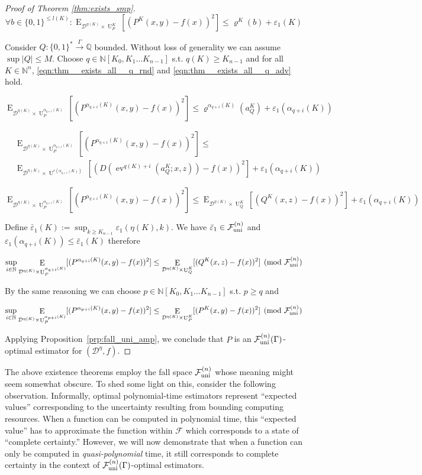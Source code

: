 \documentclass[11pt]{article}
\numberwithin{equation}{section}
\theoremstyle{definition}
\theoremstyle{plain}
\newcommand{\Bool}{\{0,1\}}
\newcommand{\Words}{{\Bool^*}}
\DeclareMathOperator{\E}{E}
\DeclareMathOperator{\Ev}{ev}
\DeclareMathOperator{\Un}{U}
\newcommand{\Nats}{\mathbb{N}}
\newcommand{\Rats}{\mathbb{Q}}
\newcommand{\NatPoly}{\Nats[K_0, K_1 \ldots K_{n-1}]}
\newcommand{\Abs}[1]{\lvert #1 \rvert}
\newcommand{\Dist}{\mathcal{D}}
\newcommand{\Fall}{\mathcal{F}}
\newcommand{\FallU}{{\Fall_{\textnormal{uni}}^{(n)}}}
\newcommand{\Scheme}{\xrightarrow{\Gamma}}
\begin{document}
\begin{proof}[Proof of Theorem \ref{thm:exists_smp}]
\[\forall b \in \Bool^{\leq l(K)}: \E_{\Dist^{\eta(K)} \times \Un_P^K}[(P^K(x,y)-f(x))^2] \leq \varrho^K(b) + \varepsilon_1(K)\]

Consider ${Q: \Words \Scheme \Rats}$ bounded. Without loss of generality we can assume ${\sup \Abs{Q} \leq M}$. Choose ${q \in \NatPoly}$ s.t. ${q(K) \geq K_{n-1}}$ and for all ${K \in \Nats^n}$, \ref{eqn:thm__exists_all__q_rnd} and \ref{eqn:thm__exists_all__q_adv} hold.

\[\E_{\Dist^{\eta(K)} \times \Un_P^{\alpha_{q+i}(K)}}[(P^{\alpha_{q+i}(K)}(x,y)-f(x))^2] \leq \varrho^{\alpha_{q+i}(K)}(a_Q^K) + \varepsilon_1(\alpha_{q+i}(K))\]

\begin{align*}
&\E_{\Dist^{\eta(K)} \times \Un_P^{\alpha_{q+i}(K)}}[(P^{\alpha_{q+i}(K)}(x,y)-f(x))^2] \leq\\ 
&\E_{\Dist^{\eta(K)} \times \Un^{r(\alpha_{q+i}(K))}}[(D(\Ev^{q(K)+i}(a_Q^K;x,z))-f(x))^2] + \varepsilon_1(\alpha_{q+i}(K))
\end{align*}

\[\E_{\Dist^{\eta(K)} \times \Un_P^{\alpha_{q+i}(K)}}[(P^{\alpha_{q+i}(K)}(x,y)-f(x))^2] \leq \E_{\Dist^{\eta(K)} \times \Un_Q^K}[(Q^K(x,z)-f(x))^2] + \varepsilon_1(\alpha_{q+i}(K))\]

Define ${\bar{\varepsilon}_1(K):=\sup_{k \geq K_{n-1}}\varepsilon_1(\eta(K),k)}$. We have ${\bar{\varepsilon}_1 \in \FallU}$ and ${\varepsilon_1(\alpha_{q+i}(K)) \leq \bar{\varepsilon}_1(K)}$ therefore

\[\sup_{i \in \Nats} \E_{\Dist^{\eta(K)} \times \Un_P^{\alpha_{q+i}(K)}}[(P^{\alpha_{q+i}(K)}(x,y)-f(x))^2] \leq \E_{\Dist^{\eta(K)} \times \Un_Q^K}[(Q^K(x,z)-f(x))^2] \pmod \FallU\]

By the same reasoning we can choose ${p \in \NatPoly}$ s.t. ${p \geq q}$ and

\[\sup_{i \in \Nats} \E_{ \Dist^{\eta(K)} \times \Un_P^{\alpha_{p+i}(K)}}[(P^{\alpha_{p+i}(K)}(x,y)-f(x))^2] \leq \E_{\Dist^{\eta(K)} \times \Un_P^K}[(P^K(x,y)-f(x))^2] \pmod \FallU\]

Applying Proposition~\ref{prp:fall_uni_amp}, we conclude that ${P}$ is an ${\FallU(\Gamma)}$-optimal estimator for ${(\Dist^\eta,f)}$.
%
\end{proof}

The above existence theorems employ the fall space ${\FallU}$ whose meaning might seem somewhat obscure. To shed some light on this, consider the following observation. Informally, optimal polynomial-time estimators represent \enquote{expected values} corresponding to the uncertainty resulting from bounding computing resources. When a function can be computed in polynomial time, this \enquote{expected value} has to approximate the function within ${\Fall}$ which corresponds to a state of \enquote{complete certainty.} However, we will now demonstrate that when a function can only be computed in \emph{quasi-polynomial} time, it still corresponds to complete certainty in the context of ${\FallU(\Gamma)}$-optimal estimators.
\end{document}
